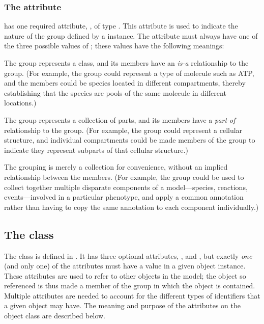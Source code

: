 \subsubsection{The \fixttspace{} attribute}
\label{kind-attribute}

\Group has one required attribute, , of type .  This attribute is used to indicate the nature of the group defined by a \Group instance.  The  attribute must always have one of the three possible values of ; these values have the following meanings:

\begin{description}[font=\normalfont\ttfamily\color{black},style=nextline]

\item[\token{classification}] The group represents a class, and its members have an \emph{is-a} relationship to the group.  (For example, the group could represent a type of molecule such as ATP, and the members could be species located in different compartments, thereby establishing that the species are pools of the same molecule in different locations.)

\item[\token{partonomy}] The group represents a collection of parts, and its members have a \emph{part-of} relationship to the group.  (For example, the group could represent a cellular structure, and individual compartments could be made members of the group to indicate they represent subparts of that cellular structure.)

\item[\token{collection}] The grouping is merely a collection for convenience, without an implied relationship between the members.  (For example, the group could be used to collect together multiple disparate components of a model---species, reactions, events---involved in a particular phenotype, and apply a common annotation rather than having to copy the same annotation to each component individually.)

\end{description}


\subsection{The  class}
\label{member-class}

The \Member class is defined in .  It has three optional attributes, ,  and , but exactly \emph{one} (and only one) of the attributes must have a value in a given \Member object instance.  These attributes are used to refer to other objects in the model; the object so referenced is thus made a member of the group in which the \Member object is contained.  Multiple attributes are needed to account for the different types of identifiers that a given object may have.  The meaning and purpose of the attributes on the object class are described below.


